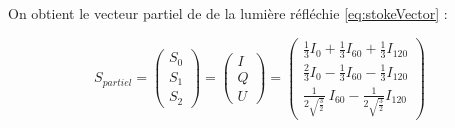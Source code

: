 On obtient le vecteur partiel de \citeauthor{stokes_composition_1851} de la lumière réfléchie \ref{eq:stokeVector} \cite{li_method_2014} :

\begin{equation}
	S_{partiel} =
	\left(\!\!\!
		\begin{array}{c}
			S_0 \\
			S_1 \\
			S_2
		\end{array}
	\!\!\!\right) =
	\left(\!\!\!
		\begin{array}{c}
			I \\
			Q \\
			U
		\end{array}
	\!\!\!\right) =
	\left(\!\!\!
		\begin{array}{c}
			\frac{1}{3} I_{0} + \frac{1}{3} I_{60} + \frac{1}{3} I_{120} \\
			\frac{2}{3} I_{0} - \frac{1}{3} I_{60} -  \frac{1}{3} I_{120} \\
			\frac{1}{2 \sqrt{\frac{3}{2}}} \ I_{60} - \frac{1}{2 \sqrt{\frac{3}{2}}} I_{120}
		\end{array}
	\!\!\!\right)
	\label{eq:stokeVector}
\end{equation}

